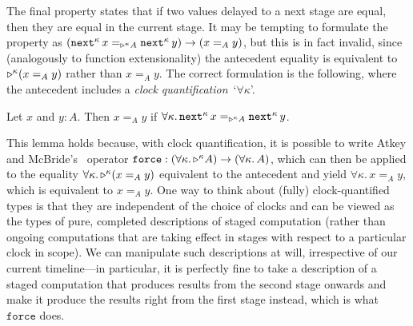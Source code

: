 \documentclass[draft,a4paper,UKenglish,numberwithinsect,cleveref,thm-restate]{lipics-v2021}
\numberwithin{equation}{section}
\theoremstyle{definition}
\theoremstyle{plain}
\begin{document}
The final property states that if two values delayed to a next stage are equal, then they are equal in the current stage.
It may be tempting to formulate the property as $(\mathtt{next}^\kappa\, x =_{\mathord{\triangleright}^\kappa A} \mathtt{next}^\kappa\, y) \to (x =_A y)$, but this is in fact invalid, since (analogously to function extensionality) the antecedent equality is equivalent to $\mathord{\triangleright}^\kappa (x =_A y)$ rather than $x =_A y$.%
The correct formulation is the following, where the antecedent includes a \emph{clock quantification}~`$\forall\kappa$'.
\begin{lemma}\label{lem:later-identity}
  Let $x$ and $y : A$. Then $x =_A y$ if\/ $\forall \kappa.\, \mathtt{next}^\kappa\,x =_{\mathord{\triangleright}^\kappa A} \mathtt{next}^\kappa\,y$.
\end{lemma}
This lemma holds because, with clock quantification, it is possible to write Atkey and McBride's~\cite{Atkey2013b} operator $\mathtt{force} : (\forall\kappa.\, \mathord{\triangleright}^\kappa A) \to (\forall\kappa.\, A)$, which can then be applied to the equality $\forall\kappa.\, \mathord{\triangleright}^\kappa (x =_A y)$ equivalent to the antecedent and yield $\forall\kappa.\, x =_A y$, which is equivalent to $x =_A y$.
One way to think about (fully) clock-quantified types is that they are independent of the choice of clocks and can be viewed as the types of pure, completed descriptions of staged computation (rather than ongoing computations that are taking effect in stages with respect to a particular clock in scope).
We can manipulate such descriptions at will, irrespective of our current timeline---in particular, it is perfectly fine to take a description of a staged computation that produces results from the second stage onwards and make it produce the results right from the first stage instead, which is what $\mathtt{force}$ does.

\end{document}

